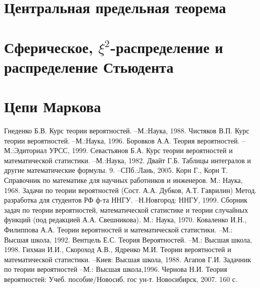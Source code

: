 \documentclass[a4paper,14pt]{extarticle}
\theoremstyle{definition}
\theoremstyle{definition}
\theoremstyle{remark}
\begin{document}
\section{Центральная предельная теорема} 

\section{Сферическое, $\xi^2$-распределение и распределение Стьюдента} 

\section{Цепи Маркова} 

\newpage
\begin{thebibliography}{12} 
	Гнеденко Б.В. Курс теории вероятностей. --М.:Наука, 1988.
	Чистяков В.П. Курс теории вероятностей. –М.:Наука, 1996.
\bibitem{}
	Боровков А.А. Теория вероятностей. – М.:Эдиториал УРСС, 1999.
	Севастьянов Б.А. Курс теории вероятностей и математической статистики. –М.:Наука, 1982.
	Двайт Г.Б. Таблицы интегралов и другие математические формулы.
	9. –СПб.:Лань, 2005.
	Корн Г., Корн Т. Справочник по математике для научных работников и инженеров. М.: Наука, 1968.
	Задачи по теории вероятностей (Сост. А.А. Дубков, А.Т. Гаврилин) Метод. разработка для студентов РФ ф-та ННГУ. –Н.Новгород: ННГУ, 1999. %
	Сборник задач по теории вероятностей, математической статистике и теории случайных функций (под редакцией А.А. Свешникова). М.: Наука, 1970.
	Коваленко И.Н., Филиппова А.А. Теории вероятностей и математической статистики. –М.: Высшая школа, 1992.
	Вентцель Е.С. Теория Вероятностей. –М.: Высшая школа, 1998.
	Гихман И.И., Скороход А.В., Ядренко М.И. Теории вероятностей и математической статистики. –Киев: Высшая школа, 1988.
	Агапов Г.И. Задачник по теории вероятностей –М.: Высшая школа,1996.
	Чернова Н.И. Теория вероятностей: Учеб. пособие/Новосиб. гос ун-т. Новосибирск, 2007. 160 с.
\end{thebibliography}
\end{document}
